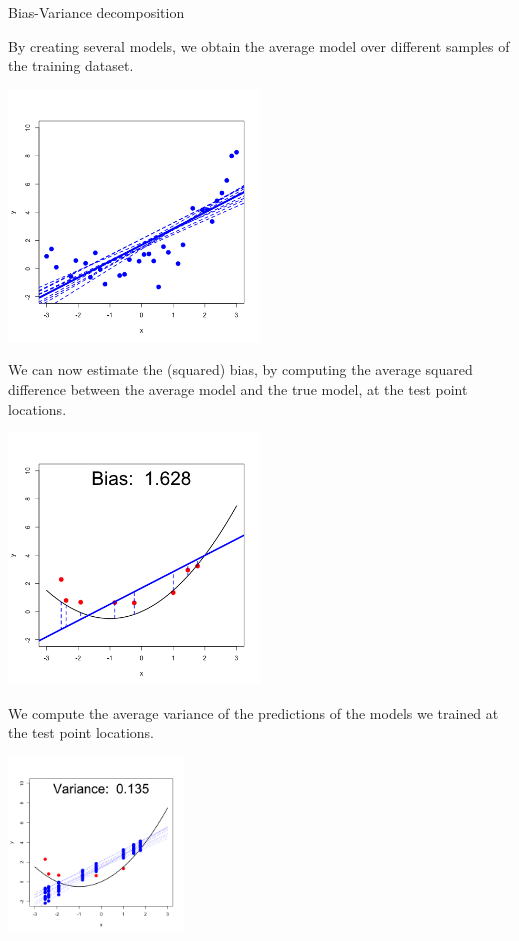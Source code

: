 \documentclass[11pt,compress,t,notes=noshow, xcolor=table]{beamer}
\begin{document}
\begin{vbframe} {Bias-Variance decomposition}
\framebreak

By creating several models, we obtain the average model over different samples of the training dataset.

\begin{center}
  \includegraphics[width = 0.5\textwidth]{figure/bias_variance_decomposition-linear_model.png}
\end{center}

\framebreak

We can now estimate the (squared) bias, by computing the average squared difference between the average model and the true model, at the test point locations.

\begin{center}
  \includegraphics[width = 0.5\textwidth]{figure/bias_variance_decomposition-linear_model_bias.png}
\end{center}

\framebreak

We compute the average variance of the predictions of the models we trained at the test point locations.
\vspace{-0.35cm}
\begin{center}
  \includegraphics[width = 0.35\textwidth]{figure/bias_variance_decomposition-linear_model_variance.png}
\end{center}
\vspace{-0.8cm}


\end{vbframe}
\end{document}
